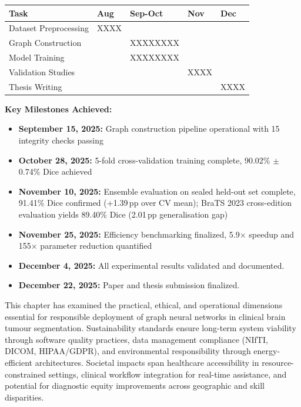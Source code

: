 \documentclass{article}
\begin{document}
\begin{center}
\begin{tabularx}{\textwidth} { 
  | >{\raggedright\arraybackslash}X 
  | >{\centering\arraybackslash}X 
  | >{\centering\arraybackslash}X 
  | >{\centering\arraybackslash}X 
  | >{\centering\arraybackslash}X 
  | }
\hline
\textbf{Task} & \textbf{Aug} & \textbf{Sep-Oct} & \textbf{Nov} & \textbf{Dec}\\
\hline
Dataset Preprocessing & \cellcolor{gray!30}XXXX & & &\\
\hline
Graph Construction & & \cellcolor{gray!30}XXXXXXXX & &\\
\hline
Model Training & & \cellcolor{gray!30}XXXXXXXX & &\\
\hline
Validation Studies & & & \cellcolor{gray!30}XXXX &\\
\hline
Thesis Writing & & & & \cellcolor{gray!30}XXXX\\
\hline
\end{tabularx}
\end{center}

\textbf{Key Milestones Achieved:}
\begin{itemize}
    \item \textbf{September 15, 2025:} Graph construction pipeline operational with 15 integrity checks passing
    \item \textbf{October 28, 2025:} 5-fold cross-validation training complete, 90.02\% $\pm$ 0.74\% Dice achieved
    \item \textbf{November 10, 2025:} Ensemble evaluation on sealed held-out set complete, 91.41\% Dice confirmed (+1.39\,pp over CV mean); BraTS 2023 cross-edition evaluation yields 89.40\% Dice (2.01\,pp generalisation gap)
    \item \textbf{November 25, 2025:} Efficiency benchmarking finalized, 5.9$\times$ speedup and 155$\times$ parameter reduction quantified
    \item \textbf{December 4, 2025:} All experimental results validated and documented.
    \item \textbf{December 22, 2025:} Paper and thesis submission finalized.
\end{itemize}

\vspace{5mm}

This chapter has examined the practical, ethical, and operational dimensions essential for responsible deployment of graph neural networks in clinical brain tumour segmentation. Sustainability standards ensure long-term system viability through software quality practices, data management compliance (NIfTI, DICOM, HIPAA/GDPR), and environmental responsibility through energy-efficient architectures. Societal impacts span healthcare accessibility in resource-constrained settings, clinical workflow integration for real-time assistance, and potential for diagnostic equity improvements across geographic and skill disparities.
\end{document}
